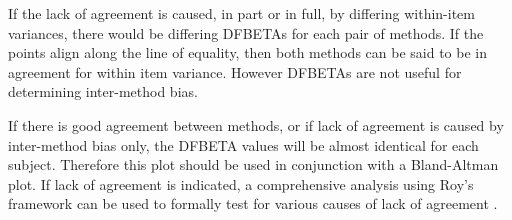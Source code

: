 \documentclass[12pt, a4paper]{report}
\theoremstyle{definition}
\theoremstyle{remark}
\begin{document}
If the lack of agreement is caused, in part or in full, by differing within-item variances, there would be differing DFBETAs for each pair of methods. If the points align along the line of equality, then both methods can be said to be in agreement for within item variance. However DFBETAs are not useful for determining inter-method bias. 

If there is good agreement between methods, or if lack of agreement is caused by inter-method bias only, the DFBETA values will be almost identical for each subject. Therefore this plot should be used in conjunction with a Bland-Altman plot. If lack of agreement is indicated, a comprehensive analysis using Roy's framework can be used to formally test for various causes of lack of agreement \citep{ARoy2009}.
	
\end{document}
